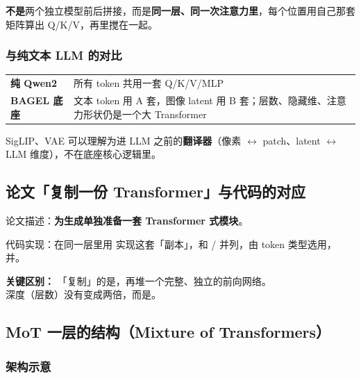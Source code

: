 \begin{intubox}
\textbf{不是}两个独立模型前后拼接，而是\textbf{同一层、同一次注意力里}，每个位置用自己那套矩阵算出 Q/K/V，再里搅在一起。
\end{intubox}

\subsubsection{与纯文本 LLM 的对比}

\begin{center}
{\small
\begin{tabular}{p{3cm}p{10cm}}
\hline
\textbf{纯 Qwen2} & 所有 token 共用一套 Q/K/V/MLP \\
\textbf{BAGEL 底座} & 文本 token 用 A 套，图像 latent 用 B 套；层数、隐藏维、注意力形状仍是一个大 Transformer \\
\hline
\end{tabular}
}
\end{center}

SigLIP、VAE 可以理解为进 LLM 之前的\textbf{翻译器}（像素 $\leftrightarrow$ patch、latent $\leftrightarrow$ LLM 维度），不在底座核心逻辑里。

\subsection{论文「复制一份 Transformer」与代码的对应}

论文描述：\textbf{为生成单独准备一套 Transformer 式模块}。

代码实现：在同一层里用  实现这套「副本」，和 / 并列，由 token 类型选用，并。

\begin{warnbox}
\textbf{关键区别：} 「复制」的是，再堆一个完整、独立的前向网络。\\
深度（层数）没有变成两倍，而是。
\end{warnbox}

\subsection{MoT 一层的结构（Mixture of Transformers）}

\subsubsection{架构示意}

